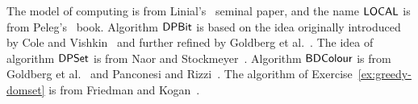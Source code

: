 The model of computing is from Linial's~\cite{linial92locality} seminal paper, and the name $\textup{\sffamily LOCAL}$ is from Peleg's~\cite{peleg00distributed} book. Algorithm $\textup{\sffamily DPBit}$ is based on the idea originally introduced by Cole and Vishkin~\cite{cole86deterministic} and further refined by Goldberg et al.~\cite{goldberg88parallel}. The idea of algorithm $\textup{\sffamily DPSet}$ is from Naor and Stockmeyer~\cite{naor95what}. Algorithm $\textup{\sffamily BDColour}$ is from Goldberg et al.~\cite{goldberg88parallel} and Panconesi and Rizzi~\cite{panconesi01some}. The algorithm of Exercise~\ref{ex:greedy-domset} is from Friedman and Kogan~\cite{friedman11deterministic}.
